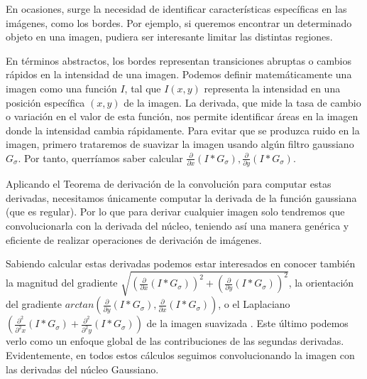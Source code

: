 \begin{ejemplo}
En ocasiones, surge la necesidad de identificar características específicas en las imágenes, como los bordes. Por ejemplo, si queremos encontrar un determinado objeto en una imagen, pudiera ser interesante limitar las distintas regiones.

\noindent En términos abstractos, los bordes representan transiciones abruptas o cambios rápidos en la intensidad de una imagen. Podemos definir matemáticamente una imagen como una función $I$, tal que $I(x, y)$ representa la intensidad en una posición específica $(x, y)$ de la imagen. La derivada, que mide la tasa de cambio o variación en el valor de esta función, nos permite identificar áreas en la imagen donde la intensidad cambia rápidamente. Para evitar que se produzca ruido en la imagen, primero trataremos de suavizar la imagen usando algún filtro gaussiano $G_{\sigma}$. Por tanto, querríamos saber calcular $\frac{\partial}{\partial x}(I*G_{\sigma}), \frac{\partial}{\partial y}(I*G_{\sigma})$.


\noindent Aplicando el Teorema de derivación de la convolución para computar estas derivadas, necesitamos únicamente computar la derivada de la función gaussiana (que es regular). Por lo que para derivar cualquier imagen solo tendremos que convolucionarla con la derivada del núcleo, teniendo así una manera genérica y eficiente de realizar operaciones de derivación de imágenes.

\noindent Sabiendo calcular estas derivadas podemos estar interesados en conocer también la magnitud del gradiente $\sqrt{\left(\frac{\partial}{\partial x}(I*G_{\sigma})\right)^2+ \left(\frac{\partial}{\partial y}(I*G_{\sigma})\right)^2}$, la orientación del gradiente $arctan(\frac{\partial}{\partial y}(I*G_{\sigma}),\frac{\partial}{\partial x}(I*G_{\sigma}))$, o el Laplaciano  $\left(\frac{\partial^2}{\partial^2x}(I*G_{\sigma})+ \frac{\partial^2}{\partial^2y}(I*G_{\sigma})\right)$ de la imagen suavizada . Este último podemos verlo como un enfoque global de las contribuciones de las segundas derivadas. Evidentemente, en todos estos cálculos seguimos convolucionando la imagen con las derivadas del núcleo Gaussiano.
\end{ejemplo}


